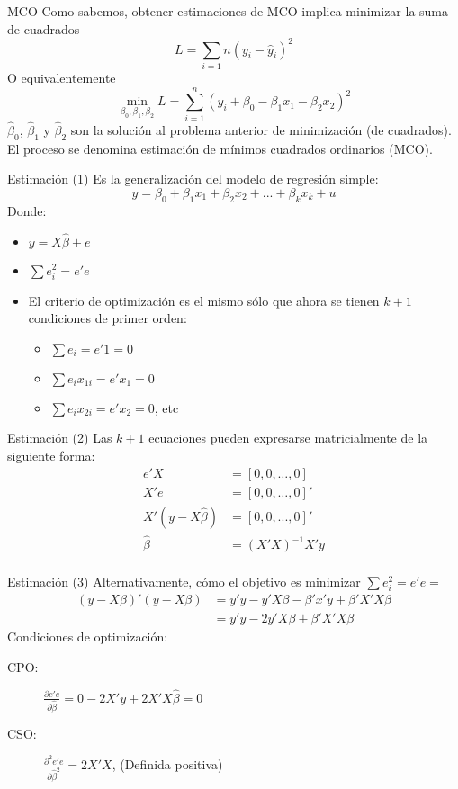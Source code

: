\begin{frame}{MCO}
	Como sabemos, obtener estimaciones de MCO implica minimizar la suma de cuadrados
	$$L = \sum_{i=1}{n}(y_{i}-\hat{y}_{i})^2$$
	O equivalentemente
	$$ \min_{\beta_{0},\beta_{1}, \beta_{2}} L = \sum_{i=1}^{n} (y_{i}+\beta_{0}-\beta_{1}x_{1}-\beta_{2}x_{2})^2$$
	$\hat{\beta}_{0}$, $\hat{\beta}_{1}$ y $\hat{\beta}_{2}$ son la solución al problema anterior de minimización (de cuadrados). El proceso se denomina estimación de mínimos cuadrados ordinarios (MCO).
\end{frame}
\begin{frame}{Estimación (1)}
	Es la generalización del modelo de regresión simple:
	$$y=\beta_{0}+\beta_{1}x_1+\beta_{2}x_2+...+\beta_{k}x_k+u$$
	Donde:
	\begin{itemize}
		\item $y=X\widehat{\beta}+e$
		\item $\sum e_i^2=e'e$
		\item El criterio de optimización es el mismo sólo que ahora se tienen $k+1$ condiciones de primer orden:
		\bigskip
		\begin{itemize}
			\item $\sum e_i=e'1=0$
			\item $\sum e_i x_{1i}=e'x_1=0$
			\item $\sum e_i x_{2i}=e'x_2=0$, etc
		\end{itemize}
	\end{itemize}
\end{frame}
\begin{frame}{Estimación (2)}
	Las $k+1$ ecuaciones pueden expresarse matricialmente de la siguiente forma:
	\begin{align*}
		e'X & = [0, 0, \ldots ,0] \\
		X'e & = [0, 0, \ldots ,0]' \\ 
		X'(y-X\widehat{\beta}) &= [0,0,...,0]' \\
		\widehat{\beta}&= (X'X)^{-1}X'y  \\
	\end{align*}
\end{frame}
\begin{frame}{Estimación (3)}
	Alternativamente, cómo el objetivo es minimizar $\sum e_i^2=e'e=$
	\begin{align*}
		(y-X\beta)'(y-X\beta) & = y'y-y'X\beta-\beta'x'y+\beta'X'X\beta \\
		& = y'y-2y'X\beta+\beta'X'X\beta
	\end{align*}
	Condiciones de optimización:
	\bigskip
	\begin{description}
		\item[CPO:] $\frac{\partial e'e}{\partial\widehat{\beta}}=0-2X'y+2X'X\widehat{\beta}=0$
		\item[CSO:] $\frac{\partial^2 e'e}{\partial\widehat{\beta}^2}=2X'X$, (Definida positiva)
	\end{description}
\end{frame}